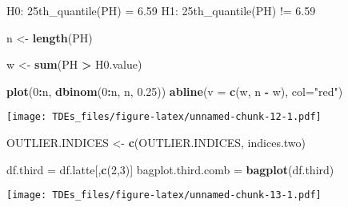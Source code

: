 \documentclass[
]{article}
\newenvironment{Shaded}{\begin{snugshade}}{\end{snugshade}}
\newcommand{\AttributeTok}[1]{\textcolor[rgb]{0.13,0.29,0.53}{#1}}
\newcommand{\CommentTok}[1]{\textcolor[rgb]{0.56,0.35,0.01}{\textit{#1}}}
\newcommand{\ControlFlowTok}[1]{\textcolor[rgb]{0.13,0.29,0.53}{\textbf{#1}}}
\newcommand{\DecValTok}[1]{\textcolor[rgb]{0.00,0.00,0.81}{#1}}
\newcommand{\FloatTok}[1]{\textcolor[rgb]{0.00,0.00,0.81}{#1}}
\newcommand{\FunctionTok}[1]{\textcolor[rgb]{0.13,0.29,0.53}{\textbf{#1}}}
\newcommand{\NormalTok}[1]{#1}
\newcommand{\OtherTok}[1]{\textcolor[rgb]{0.56,0.35,0.01}{#1}}
\newcommand{\SpecialCharTok}[1]{\textcolor[rgb]{0.81,0.36,0.00}{\textbf{#1}}}
\newcommand{\StringTok}[1]{\textcolor[rgb]{0.31,0.60,0.02}{#1}}
\begin{document}
H0: 25th\_quantile(PH) = 6.59 H1: 25th\_quantile(PH) != 6.59

\begin{Shaded}
\begin{Highlighting}[]
\NormalTok{n }\OtherTok{\textless{}{-}} \FunctionTok{length}\NormalTok{(PH)}

\NormalTok{w }\OtherTok{\textless{}{-}} \FunctionTok{sum}\NormalTok{(PH }\SpecialCharTok{\textgreater{}}\NormalTok{ H0.value)}

\FunctionTok{plot}\NormalTok{(}\DecValTok{0}\SpecialCharTok{:}\NormalTok{n, }\FunctionTok{dbinom}\NormalTok{(}\DecValTok{0}\SpecialCharTok{:}\NormalTok{n, n, }\FloatTok{0.25}\NormalTok{))}
\FunctionTok{abline}\NormalTok{(}\AttributeTok{v =} \FunctionTok{c}\NormalTok{(w, n }\SpecialCharTok{{-}}\NormalTok{ w), }\AttributeTok{col=}\StringTok{"red"}\NormalTok{)}
\end{Highlighting}
\end{Shaded}

\texttt{[image: TDEs\_files/figure-latex/unnamed-chunk-12-1.pdf]}

\begin{Shaded}
\begin{Highlighting}[]
\NormalTok{OUTLIER.INDICES }\OtherTok{\textless{}{-}} \FunctionTok{c}\NormalTok{(OUTLIER.INDICES, indices.two)}


\NormalTok{df.third }\OtherTok{=}\NormalTok{ df.latte[,}\FunctionTok{c}\NormalTok{(}\DecValTok{2}\NormalTok{,}\DecValTok{3}\NormalTok{)]}
\NormalTok{bagplot.third.comb }\OtherTok{=} \FunctionTok{bagplot}\NormalTok{(df.third)}
\end{Highlighting}
\end{Shaded}

\texttt{[image: TDEs\_files/figure-latex/unnamed-chunk-13-1.pdf]}

\begin{Shaded}
\end{Shaded}
\end{document}
